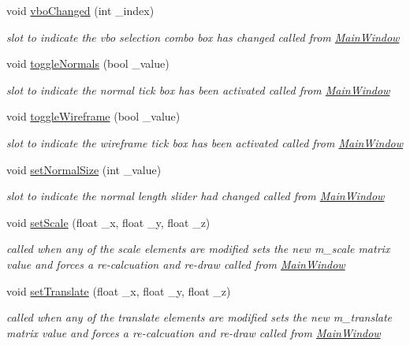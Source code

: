 \begin{DoxyCompactItemize}
\item 
void \hyperlink{classGLWindow_ace72b2071df8b0415d76011d747cdb36}{vbo\+Changed} (int \+\_\+index)
\begin{DoxyCompactList}\small\item\em slot to indicate the vbo selection combo box has changed called from \hyperlink{classMainWindow}{Main\+Window} \end{DoxyCompactList}\item 
void \hyperlink{classGLWindow_a3101b6a32ac18c0c1f26fc6753d8ff22}{toggle\+Normals} (bool \+\_\+value)
\begin{DoxyCompactList}\small\item\em slot to indicate the normal tick box has been activated called from \hyperlink{classMainWindow}{Main\+Window} \end{DoxyCompactList}\item 
void \hyperlink{classGLWindow_a221ed4a9a24a2639f3cd4398476d7a71}{toggle\+Wireframe} (bool \+\_\+value)
\begin{DoxyCompactList}\small\item\em slot to indicate the wireframe tick box has been activated called from \hyperlink{classMainWindow}{Main\+Window} \end{DoxyCompactList}\item 
void \hyperlink{classGLWindow_a5def6c0eceb97287c9281e8994c741ca}{set\+Normal\+Size} (int \+\_\+value)
\begin{DoxyCompactList}\small\item\em slot to indicate the normal length slider had changed called from \hyperlink{classMainWindow}{Main\+Window} \end{DoxyCompactList}\item 
void \hyperlink{classGLWindow_a36debb64f302762ef25187b053df91ab}{set\+Scale} (float \+\_\+x, float \+\_\+y, float \+\_\+z)
\begin{DoxyCompactList}\small\item\em called when any of the scale elements are modified sets the new m\+\_\+scale matrix value and forces a re-\/calcuation and re-\/draw called from \hyperlink{classMainWindow}{Main\+Window} \end{DoxyCompactList}\item 
void \hyperlink{classGLWindow_ace1f2e0ba90bdfa04d3792e41c9bb40c}{set\+Translate} (float \+\_\+x, float \+\_\+y, float \+\_\+z)
\begin{DoxyCompactList}\small\item\em called when any of the translate elements are modified sets the new m\+\_\+translate matrix value and forces a re-\/calcuation and re-\/draw called from \hyperlink{classMainWindow}{Main\+Window} \end{DoxyCompactList}\item 

\end{DoxyCompactItemize}
